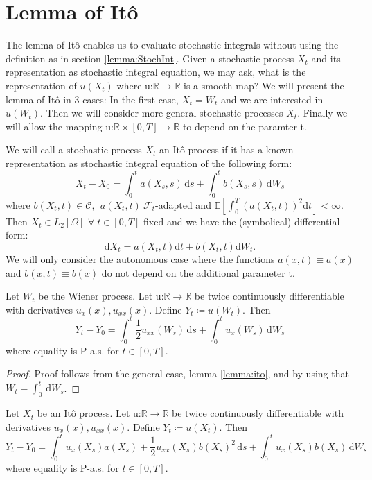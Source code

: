 \section{Lemma of It\^o}
\label{itolemma}
The lemma of It\^o enables us to evaluate stochastic integrals without using the definition as in section \ref{lemma:StochInt}. 
Given a stochastic process \(X_t\) and its representation as stochastic integral equation, we may ask, what is the representation of \(u(X_t)\) where u:\(\mathbb{R}\to\mathbb{R}\) is a smooth map? 
We will present the lemma of It\^o in 3 cases: In the first case, \(X_t=W_t\) and we are interested in \(u(W_t)\). Then we will consider more general stochastic processes \(X_t\). Finally we will allow the mapping u:\(\mathbb{R}\times[0,T]\to\mathbb{R}\) to depend on the paramter t.
\begin{definition}[It\^o process]
\label{Itoprocess}
We will call a stochastic process \(X_t\) an It\^o process if it has a known representation as stochastic integral equation of the following form:
\[X_t - X_0 = \int_0^t \!a(X_s,s)\,\mathrm{d}s + \int_0^t \!b(X_s,s)\,\mathrm{d}W_{s}\]
where \(b(X_t,t)\in\mathcal{C},\:\: a(X_t,t)\: \mathcal{F}_t\)-adapted and \(\mathbb{E}[\int_{0}^{T}(a(X_t,t))^2\mathrm{d}t]<\infty\). \\
Then \(X_t\in L_2[\Omega]\) \(\forall\; t\in[0,T]\) fixed and we have the (symbolical) differential form:
\[\mathrm{d}X_t = a(X_t,t)\mathrm{d}t + b(X_t,t)\mathrm{d}W_t.\]
We will only consider the autonomous case where the functions \(a(x,t) \equiv a(x)\) and \(b(x,t) \equiv b(x)\) do not depend on the additional parameter t.

\end{definition}
\begin{lemma}
Let \(W_t\) be the Wiener process. Let u:\(\mathbb{R}\to\mathbb{R}\) be twice continuously differentiable with derivatives \(u_x(x), u_{xx}(x)\). Define \(Y_t \coloneqq u(W_t)\). Then
\begin{displaymath}
Y_t-Y_0 = \int_0^t \!\frac{1}{2}u_{xx}(W_s)\,\mathrm{d}s + \int_0^t \!u_x(W_s)\,\mathrm{d}W_{s}
\end{displaymath}
where equality is P-a.s. for \(t\in[0,T]\).
\end{lemma}
\begin{proof}
Proof follows from the general case, lemma \ref{lemma:ito}, and by using that \(W_t = \int_0^t \!\,\mathrm{d}W_{s}\).
\end{proof}
\begin{lemma}
Let \(X_t\) be an It\^o process. 
Let u:\(\mathbb{R}\to\mathbb{R}\) be twice continuously differentiable with derivatives \(u_x(x), u_{xx}(x)\). Define \(Y_t \coloneqq u(X_t)\). Then
\begin{displaymath}
Y_t-Y_0  = \int_0^t \!u_x(X_s)a(X_s) + \frac{1}{2}u_{xx}(X_s)b(X_s)^2\,\mathrm{d}s + \int_0^t \!u_x(X_s)b(X_s)\,\mathrm{d}W_{s} 
\end{displaymath}
where equality is P-a.s. for \(t\in[0,T]\).
\end{lemma}
